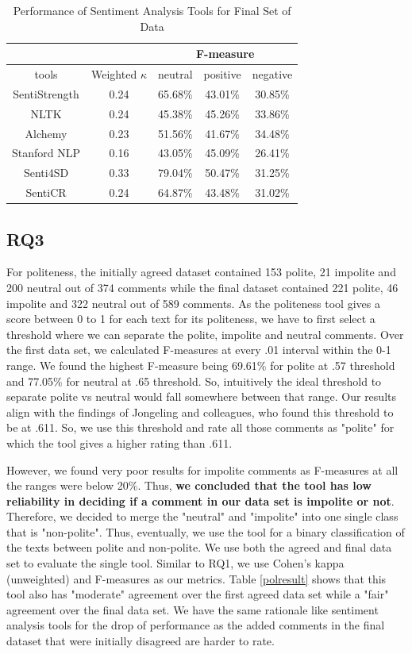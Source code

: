 \begin{table}
\centering
\caption{Performance of Sentiment Analysis Tools for Final Set of Data}
\label{sentfinal}
\begin{tabular}{|c|c|c|c|c|}
\hline
\multicolumn{2}{|c|}{ } & \multicolumn{3}{c|}{ F-measure } \\
\hline
tools & Weighted $\kappa$ & neutral & positive & negative \\
\hline
SentiStrength & 0.24 & 65.68\% & 43.01\% & 30.85\% \\
\hline
NLTK & 0.24 & 45.38\% & 45.26\% & 33.86\% \\
\hline
Alchemy & 0.23 & 51.56\% & 41.67\% & 34.48\% \\
\hline
Stanford NLP & 0.16 & 43.05\% & 45.09\% & 26.41\% \\
\hline
Senti4SD & 0.33 & 79.04\% & 50.47\% &  31.25\% \\
\hline
SentiCR & 0.24 & 64.87\% & 43.48\% & 31.02\% \\
\hline
\end{tabular}
\end{table}

\subsection{RQ3}

For politeness, 
the initially agreed dataset contained 
153 polite, 21 impolite and 200 neutral 
out of 374 comments 
while the final dataset contained 
221 polite, 46 impolite and 322 neutral 
out of 589 comments. 
As the politeness tool
gives a score between 0 to 1 
for each text for its politeness, 
we have to first select a threshold 
where we can separate the polite, impolite and neutral comments. 
Over the first data set, we calculated F-measures 
at every .01 interval within the 0-1 range. 
We found the highest F-measure 
being 69.61\%  for polite at .57 threshold 
and 77.05\% for neutral at .65 threshold. 
So, intuitively the ideal threshold 
to separate polite vs neutral 
would fall somewhere between that range. 
Our results align with the findings of Jongeling and colleagues,
who found this threshold to be at .611. 
So, we use this threshold and 
rate all those comments as "polite" 
for which the tool gives a higher rating than .611.

However, we found 
very poor results
for impolite comments 
as F-measures at all the ranges were below 20\%. 
Thus, \textbf{we concluded that 
the tool has low reliability 
in deciding if a comment in our data set is impolite or not}. 
Therefore, we decided to merge the "neutral" and "impolite"
into one single class that is "non-polite". 
Thus, eventually, we use the tool 
for a binary classification of the texts 
between polite and non-polite.
We use both the agreed and final data set
to evaluate the single tool. 
Similar to RQ1, 
we use Cohen's kappa (unweighted) and F-measures as our metrics. Table \ref{polresult} shows that this tool also 
has "moderate" agreement over the first agreed data set 
while a "fair" agreement over the final data set. 
We have the same rationale like sentiment analysis tools 
for the drop of performance 
as the added comments in the final dataset 
that were initially disagreed are harder to rate.  

